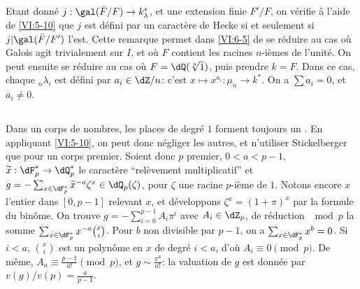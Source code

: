 \subsection{}\label{VI:6-6}

Etant donné $j:\gal(\bar F/F) \to k_\lambda^\ast$, et une extension finie 
$F'/F$, on vérifie à l'aide de \ref{VI:5-10} que $j$ est défini par un 
caractère de Hecke si et seulement si $j|\gal(\bar F/F')$ l'est. Cette 
remarque permet dans \ref{VI:6-5} de se réduire au cas où Galois agit 
trivialement sur $I$, et où $F$ contient les racines $n$-ièmes de 
l'unité. On peut ensuite se réduire au cas où $F=\dQ(\sqrt[n]{1})$, puis 
prendre $k=F$. Dans ce cas, chaque $_n \lambda_i$ est défini par 
$a_i\in \dZ/n$: c'est $x\mapsto x^{a_i}:\mu_n \to k^\ast$. On a 
$\sum a_i=0$, et $a_i\ne 0$. 





\subsection{}\label{VI:6-7}

Dans un corps de nombres, les places de degré $1$ forment toujours un 
. En appliquant \ref{VI:5-10}, on peut donc négliger 
les autres, et n'utiliser Stickelberger que pour un corps premier. Soient donc 
$p$ premier, $0<a<p-1$, $\widetilde x:\dF_p^\ast \to \dQ_p^\ast$ le 
caractère ``relèvement multiplicatif'' et 
$g=-\sum_{x\in \dF_p^\ast} \widetilde x^{-a} \zeta^x\in \dQ_p(\zeta)$, pour 
$\zeta$ une racine $p$-ième de $1$. Notons encore $x$ l'entier dans $[0,p-1]$ 
relevant $x$, et développons $\zeta^x=(1+\pi)^x$ par la formule du binôme. 
On trouve $g=-\sum_{i=0}^{p-1} A_i\pi^i$ avec $A_i\in \dZ_p$, de réduction 
$\mod p$ la somme $\sum_{x\in \dF_p^\ast} x^{-a} \binom x i$. Pour $b$ non 
divisible par $p-1$, on a $\sum_{x\in \dF_p^\ast} x^b=0$. Si $i<a$, 
$\binom x i$ est un polynôme en $x$ de degré $i<a$, d'où 
$A_i\equiv 0\pmod p$. De même, $A_a\equiv \frac{p-1}{a!} \pmod p$, et 
$g\sim \frac{\pi^a}{a!}$: la valuation de $g$ est donnée par 
$v(g)/v(p) = \frac{a}{p-1}$. 





\subsection{}\label{VI:6-8}

